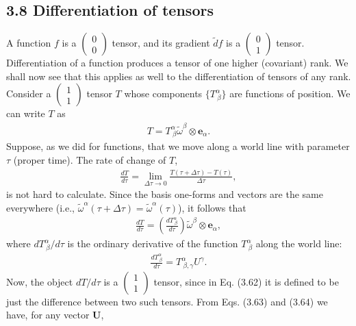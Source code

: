 \documentclass[12pt]{book}
\begin{document}
    \subsection{3.8 Differentiation of tensors}
    A function \(f\) is a \(\left(\begin{array}{c} 0 \\ 0 \end{array}\right)\) tensor, and its gradient \(\tilde{d}f\) is a \(\left(\begin{array}{c} 0 \\ 1 \end{array}\right)\) tensor. Differentiation of a function produces a tensor of one higher (covariant) rank. We shall now see that this applies as well to the differentiation of tensors of any rank. 
    Consider a \(\left(\begin{array}{c} 1 \\ 1 \end{array}\right)\) tensor \(T\) whose components \(\{T^\alpha_{\ \beta}\}\) are functions of position. We can write \(T\) as
    \begin{align}
    T = T^\alpha_{\ \beta} \tilde{\omega}^\beta \otimes \mathbf{e}_\alpha. \tag{3.61}
    \end{align}
    Suppose, as we did for functions, that we move along a world line with parameter \(\tau\) (proper time). The rate of change of \(T\),
    \begin{align}
    \frac{dT}{d\tau} = \lim_{\Delta \tau \rightarrow 0} \frac{T(\tau + \Delta \tau) - T(\tau)}{\Delta \tau}, \tag{3.62}
    \end{align}
    is not hard to calculate. Since the basis one-forms and vectors are the same everywhere (i.e., \(\tilde{\omega}^\alpha(\tau + \Delta \tau) = \tilde{\omega}^\alpha(\tau)\)), it follows that
    \begin{align}
    \frac{dT}{d\tau} = \left(\frac{dT^\alpha_{\ \beta}}{d\tau}\right) \tilde{\omega}^\beta \otimes \mathbf{e}_\alpha, \tag{3.63}
    \end{align}
    where \(dT^\alpha_{\ \beta}/d\tau\) is the ordinary derivative of the function \(T^\alpha_{\ \beta}\) along the world line:
    \begin{align}
    \frac{dT^\alpha_{\ \beta}}{d\tau} = T^\alpha_{\ \beta, \gamma} U^\gamma. \tag{3.64}
    \end{align}
    Now, the object \(dT/d\tau\) is a \(\left(\begin{array}{c} 1 \\ 1 \end{array}\right)\) tensor, since in Eq. (3.62) it is defined to be just the difference between two such tensors. From Eqs. (3.63) and (3.64) we have, for any vector \(\mathbf{U}\),
\end{document}
